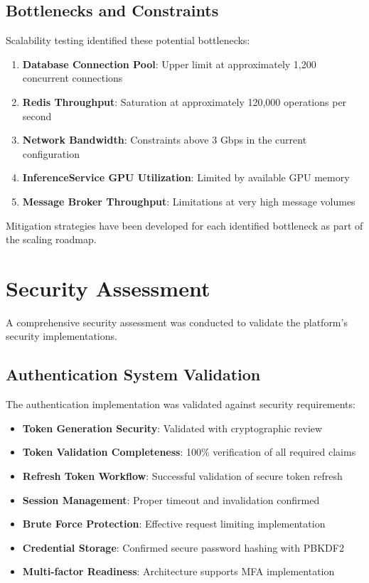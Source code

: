 \subsection{Bottlenecks and Constraints}

Scalability testing identified these potential bottlenecks:

\begin{enumerate}
    \item \textbf{Database Connection Pool}: Upper limit at approximately 1,200 concurrent connections
    \item \textbf{Redis Throughput}: Saturation at approximately 120,000 operations per second
    \item \textbf{Network Bandwidth}: Constraints above 3 Gbps in the current configuration
    \item \textbf{InferenceService GPU Utilization}: Limited by available GPU memory
    \item \textbf{Message Broker Throughput}: Limitations at very high message volumes
\end{enumerate}

Mitigation strategies have been developed for each identified bottleneck as part of the scaling roadmap.

\section{Security Assessment}

A comprehensive security assessment was conducted to validate the platform's security implementations.

\subsection{Authentication System Validation}

The authentication implementation was validated against security requirements:

\begin{itemize}
    \item \textbf{Token Generation Security}: Validated with cryptographic review
    \item \textbf{Token Validation Completeness}: 100\% verification of all required claims
    \item \textbf{Refresh Token Workflow}: Successful validation of secure token refresh
    \item \textbf{Session Management}: Proper timeout and invalidation confirmed
    \item \textbf{Brute Force Protection}: Effective request limiting implementation
    \item \textbf{Credential Storage}: Confirmed secure password hashing with PBKDF2
    \item \textbf{Multi-factor Readiness}: Architecture supports MFA implementation
\end{itemize}


